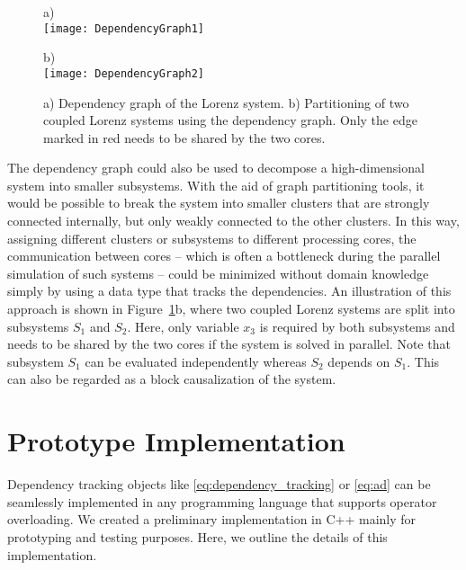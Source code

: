 \documentclass[10pt]{ijnam}
\theoremstyle{definition}
\begin{document}
\begin{figure}[htb]
    \centering
    \begin{minipage}{0.3\textwidth}
        \centering
        {\scriptsize{a)}} \\[1mm]
        \texttt{[image: DependencyGraph1]}
    \end{minipage}
    \hspace*{1cm}
    \begin{minipage}{0.346\textwidth}
        \centering
        {\scriptsize{b)}} \\[1mm]
        \texttt{[image: DependencyGraph2]}
    \end{minipage}
    \caption{a) Dependency graph of the Lorenz system. b) Partitioning of two coupled Lorenz systems using the dependency graph. Only the edge marked in red needs to be shared by the two cores.}
    \label{fig:DependencyGraph}
\end{figure}

The dependency graph could also be used to decompose a high-dimensional system into smaller subsystems. With the aid of graph partitioning tools, it would be possible to break the system into smaller clusters that are strongly connected internally, but only weakly connected to the other clusters. In this way, assigning different clusters or subsystems to different processing cores, the communication between cores -- which is often a bottleneck during the parallel simulation of such systems -- could be minimized without domain knowledge simply by using a data type that tracks the dependencies. An illustration of this approach is shown in Figure~\ref{fig:DependencyGraph}b, where two coupled Lorenz systems are split into subsystems $ S_1 $ and $ S_2 $. Here, only variable $ x_3 $ is required by both subsystems and needs to be shared by the two cores if the system is solved in parallel. Note that subsystem $ S_1 $ can be evaluated independently whereas $ S_2 $ depends on $ S_1 $. This can also be regarded as a block causalization of the system.


\section{Prototype Implementation} \label{sec:prototype}

Dependency tracking objects like \eqref{eq:dependency_tracking} or \eqref{eq:ad} can be seamlessly implemented in 
any programming language that supports operator overloading. 
We created a preliminary implementation in C++ mainly for prototyping and testing 
purposes. Here, we outline the details of this implementation.
\end{document}
